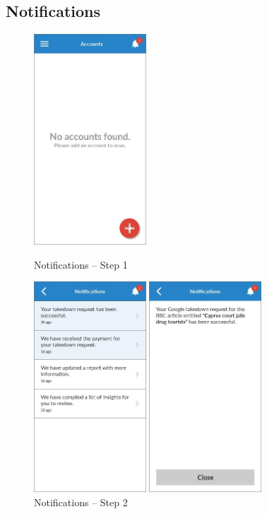 \clearpage

\subsection{Notifications}

\begin{figure}
  \subfigures
  \centering
  \begin{minipage}{4.6cm}
    \centering
    \includegraphics[width=4.2cm]{inc/ui_not_step1.jpg}
    \caption{Notifications -- Step 1}
    \label{fig:ui_not_step1}
  \end{minipage}
  \begin{minipage}{4.6cm}
    \centering
    \includegraphics[width=4.2cm]{inc/ui_not_step2.jpg}
    \caption{Notifications -- Step 2}
    \label{fig:ui_not_step2}
  \end{minipage}
  \begin{minipage}{4.6cm}
    \centering
    \includegraphics[width=4.2cm]{inc/ui_not_step3.jpg}

\end{minipage}
\end{figure}
